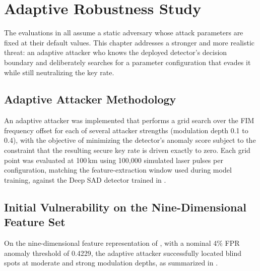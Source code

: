 \documentclass[12pt, a4paper]{report}
\begin{document}
\chapter{Adaptive Robustness Study}\label{ch:adaptive}

The evaluations in  all assume a static adversary whose attack parameters are fixed at their default values. This chapter addresses a stronger and more realistic threat: an adaptive attacker who knows the deployed detector's decision boundary and deliberately searches for a parameter configuration that evades it while still neutralizing the key rate.

\section{Adaptive Attacker Methodology}\label{sec:adaptive_method}
An adaptive attacker was implemented that performs a grid search over the FIM frequency offset for each of several attacker strengths (modulation depth 0.1 to 0.4), with the objective of minimizing the detector's anomaly score subject to the constraint that the resulting secure key rate is driven exactly to zero. Each grid point was evaluated at 100\,km using 100,000 simulated laser pulses per configuration, matching the feature-extraction window used during model training, against the Deep SAD detector trained in .

\section{Initial Vulnerability on the Nine-Dimensional Feature Set}\label{sec:adaptive_initial}
On the nine-dimensional feature representation of , with a nominal 4\% FPR anomaly threshold of 0.4229, the adaptive attacker successfully located blind spots at moderate and strong modulation depths, as summarized in .
\end{document}

